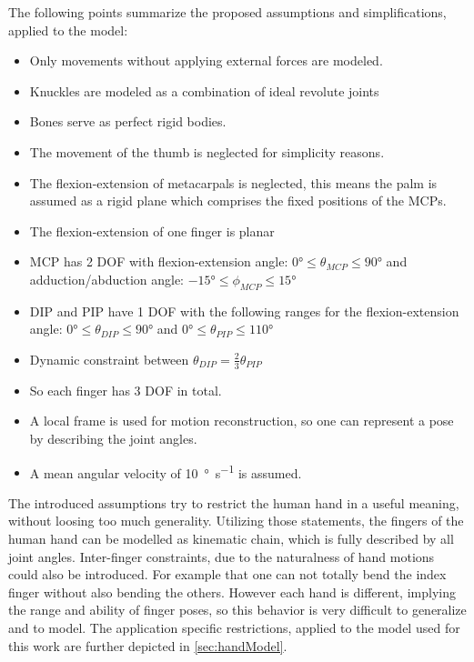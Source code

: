 The following points summarize the proposed assumptions and simplifications, applied to the model:
\begin{itemize}
\item Only movements without applying external forces are modeled.
\item Knuckles are modeled as a combination of ideal revolute joints
\item Bones serve as perfect rigid bodies.
\item The movement of the thumb is neglected for simplicity reasons.
\item The flexion-extension of metacarpals is neglected, this means the palm is assumed as a rigid plane which comprises the fixed positions of the \acp{MCP}.
\item The flexion-extension of one finger is planar
\item \ac{MCP} has 2 \ac{DOF} with flexion-extension angle: $ \ang{0} \leq \theta_{MCP} \leq \ang{90} $ and adduction/abduction angle: $ \ang{-15} \leq \phi_{MCP} \leq \ang{+15} $
\item \ac{DIP} and \ac{PIP} have 1 DOF with the following ranges for the flexion-extension angle: $ \ang{0} \leq \theta_{DIP} \leq \ang{90} $ and $ \ang{0} \leq \theta_{PIP} \leq \ang{110} $
\item Dynamic constraint between $ \theta_{DIP} = \frac{2}{3} \theta_{PIP} $
\item So each finger has 3 \ac{DOF} in total.
\item A local frame is used for motion reconstruction, so one can represent a pose by describing the joint angles.
\item A mean angular velocity of \SI[per-mode=symbol]{10}{\degree \per \second} is assumed.
\end{itemize}

The introduced assumptions try to restrict the human hand in a useful meaning, without loosing too much generality. Utilizing those statements, the fingers of the human hand can be modelled as kinematic chain, which is fully described by all joint angles. Inter-finger constraints, due to the naturalness of hand motions could also be introduced. For example that one can not totally bend the index finger without also bending the others. However each hand is different, implying the range and ability of finger poses, so this behavior is very difficult to generalize and to model. The application specific restrictions, applied to the model used for this work are further depicted in \ref{sec:handModel}.

